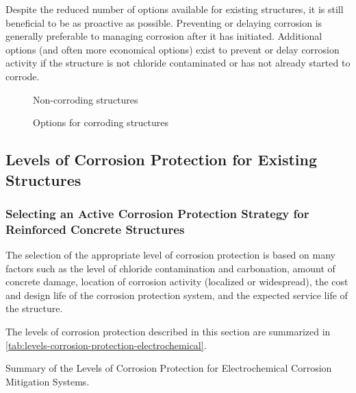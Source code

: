 Despite the reduced number of options available for existing structures, it is still beneficial to be as proactive as
possible. Preventing or delaying corrosion is generally preferable to managing corrosion after it has initiated.
Additional options (and often more economical options) exist to prevent or delay corrosion activity if the structure is
not chloride contaminated or has not already started to corrode.

\begin{figure}
  \caption{Non-corroding structures}
  \label{fig:non-corroding-structures}
\end{figure}

\begin{figure}
  \caption{Options for corroding structures}
  \label{fig:options-corrod-structures}
\end{figure}

\subsection{Levels of Corrosion Protection for Existing Structures}
\subsubsection{Selecting an Active Corrosion Protection Strategy for Reinforced Concrete Structures}
The selection of the appropriate level of corrosion protection is based on many factors such as the level of chloride contamination and carbonation, amount of concrete damage, location of corrosion activity (localized or widespread), the cost and design life of the corrosion protection system, and the expected service life of the structure.

The levels of corrosion protection described in this section are summarized in \cref{tab:levels-corrosion-protection-electrochemical}.

\begin{table}
  \caption{Summary of the Levels of Corrosion Protection for Electrochemical Corrosion Mitigation Systems.}
  \label{tab:levels-corrosion-protection-electrochemical}
\end{table}

